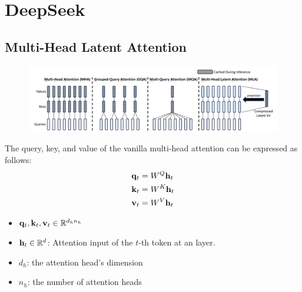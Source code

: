 \chapter{DeepSeek}
\section{Multi-Head Latent Attention}

\begin{figure}[h]
	\centering
	\includegraphics[scale=0.32]{./images/transformer/mla.png}
\end{figure}

The query, key, and value of the vanilla multi-head attention can be expressed as follows:
\begin{align*}
	{\mathbf{q}}_t &= W^{Q}{\mathbf{h}}_t\\
	{\mathbf{k}}_t &= W^{K}{\mathbf{h}}_t\\
	{\mathbf{v}}_t &= W^{V}{\mathbf{h}}_t
\end{align*}
\begin{itemize}
	\item ${\mathbf{q}}_t,{\mathbf{k}}_t,{\mathbf{v}}_t\in \mathbb{R}^{d_hn_h}$
	\item ${\mathbf{h}}_t\in \mathbb{R}^{d}$: Attention input of the $t$-th token at an layer.
	\item $d_h$: the attention head's dimension
	\item $n_h$: the number of attention heads
\end{itemize}

